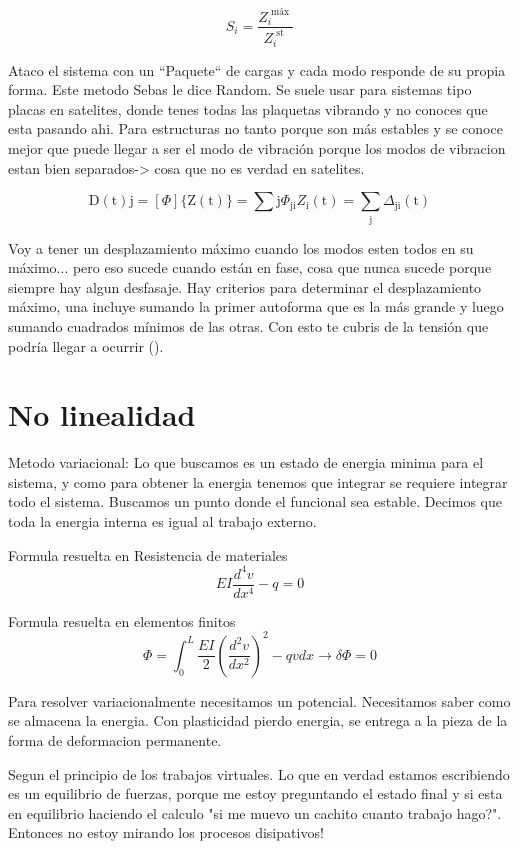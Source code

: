 \documentclass[11pt, a4paper,titlepage]{article}
\begin{document}
\[
S_{i}=\frac{Z_{i}^{\text { mâx }}}{Z_{i}^{\text { st }}}
\]

Ataco el sistema con un ``Paquete`` de cargas y cada modo responde de su propia forma. Este metodo Sebas le dice Random. Se suele usar para sistemas tipo placas en satelites, donde tenes todas las plaquetas vibrando y no conoces que esta pasando ahi. Para estructuras no tanto porque son más estables y se conoce mejor que puede llegar a ser el modo de vibración porque los modos de vibracion estan bien separados-> cosa que no es verdad en satelites. 

\[
\mathrm{D}(\mathrm{t}){\mathrm{j}}=[\Phi]\{\mathrm{Z}(\mathrm{t})\}=\sum{\mathrm{j}} \Phi_{\mathrm{ji}} Z_{\mathrm{i}}(\mathrm{t})=\sum_{\mathrm{j}} \Delta_{\mathrm{ji}}(\mathrm{t})
\]



Voy a tener un desplazamiento máximo cuando los modos esten todos en su máximo... pero eso sucede cuando están en fase, cosa que nunca sucede porque siempre hay algun desfasaje. Hay criterios para determinar el desplazamiento máximo, una incluye sumando la primer autoforma que es la más grande y luego sumando cuadrados mínimos de las otras. Con esto te cubris de la tensión que podría llegar a ocurrir ().


\section{No linealidad}
Metodo variacional: Lo que buscamos es un estado de energia minima para el sistema, y como para obtener la energia tenemos que integrar se requiere integrar todo el sistema. Buscamos un punto donde el funcional sea estable. Decimos que toda la energia interna es igual al trabajo externo. 

Formula resuelta en Resistencia de materiales
\[
E I \frac{d^{4} v}{d x^{4}}-q=0
\]

Formula resuelta en elementos finitos
\[
\Phi=\int_{0}^{L} \frac{E I}{2}\left(\frac{d^{2} v}{d x^{2}}\right)^{2}-q v d x \rightarrow \delta \Phi=0
\]

Para resolver variacionalmente necesitamos un potencial. Necesitamos saber como se almacena la energia. Con plasticidad pierdo energia, se entrega a la pieza de la forma de deformacion permanente. 

Segun el principio de los trabajos virtuales. Lo que en verdad estamos escribiendo es un equilibrio de fuerzas, porque me estoy preguntando el estado final y si esta en equilibrio haciendo el calculo "si me muevo un cachito cuanto trabajo hago?". Entonces no estoy mirando los procesos disipativos! 
\end{document}
